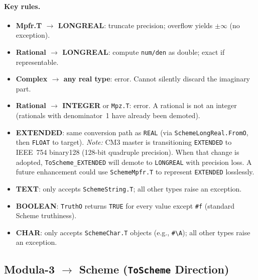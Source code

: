 \documentclass[12pt]{article}
\begin{document}
\paragraph{Key rules.}
\begin{itemize}[nosep]
\item \textbf{Mpfr.T $\to$ LONGREAL}: truncate precision;
  overflow yields $\pm\infty$ (no exception).
\item \textbf{Rational $\to$ LONGREAL}: compute {\tt num/den} as
  double; exact if representable.
\item \textbf{Complex $\to$ any real type}: error.  Cannot silently
  discard the imaginary part.
\item \textbf{Rational $\to$ INTEGER} or {\tt Mpz.T}: error.
  A rational is not an integer (rationals with denominator~1
  have already been demoted).
\item \textbf{EXTENDED}: same conversion path as {\tt REAL}
  (via {\tt SchemeLongReal.FromO}, then {\tt FLOAT} to target).
  \emph{Note:} CM3 master is transitioning {\tt EXTENDED} to
  IEEE~754 binary128 (128-bit quadruple precision).  When that
  change is adopted, {\tt ToScheme\_EXTENDED} will demote to
  {\tt LONGREAL} with precision loss.  A future enhancement could
  use {\tt SchemeMpfr.T} to represent {\tt EXTENDED} losslessly.
\item \textbf{TEXT}: only accepts {\tt SchemeString.T};
  all other types raise an exception.
\item \textbf{BOOLEAN}: {\tt TruthO} returns {\tt TRUE} for every
  value except {\tt \#f} (standard Scheme truthiness).
\item \textbf{CHAR}: only accepts {\tt SchemeChar.T} objects
  (e.g., {\tt \#\textbackslash A}); all other types raise an exception.
\end{itemize}

\subsection{Modula-3 $\to$ Scheme ({\tt ToScheme} Direction)}
\end{document}
